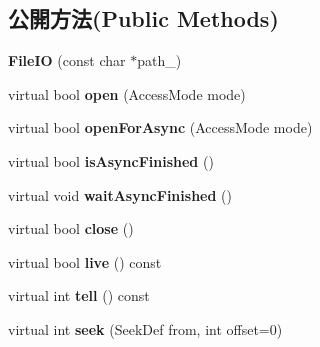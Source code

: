 \subsection*{公開方法(Public Methods)}
\begin{DoxyCompactItemize}
\item 
{\bfseries File\+IO} (const char $\ast$path\+\_\+)\hypertarget{class_i_dream_sky_1_1_file_i_o_a622f1f3857a55efd3cbae3e5ce7fbffb}{}\label{class_i_dream_sky_1_1_file_i_o_a622f1f3857a55efd3cbae3e5ce7fbffb}

\item 
virtual bool {\bfseries open} (Access\+Mode mode)\hypertarget{class_i_dream_sky_1_1_file_i_o_a3bf33683555f954f5854f97cd8536c24}{}\label{class_i_dream_sky_1_1_file_i_o_a3bf33683555f954f5854f97cd8536c24}

\item 
virtual bool {\bfseries open\+For\+Async} (Access\+Mode mode)\hypertarget{class_i_dream_sky_1_1_file_i_o_a97cd005ad13e08d09b33ad8e440ec09d}{}\label{class_i_dream_sky_1_1_file_i_o_a97cd005ad13e08d09b33ad8e440ec09d}

\item 
virtual bool {\bfseries is\+Async\+Finished} ()\hypertarget{class_i_dream_sky_1_1_file_i_o_a57231b695b6fedfc5010d3635e257710}{}\label{class_i_dream_sky_1_1_file_i_o_a57231b695b6fedfc5010d3635e257710}

\item 
virtual void {\bfseries wait\+Async\+Finished} ()\hypertarget{class_i_dream_sky_1_1_file_i_o_a5632bc0f6c84128f814d0005ec27f147}{}\label{class_i_dream_sky_1_1_file_i_o_a5632bc0f6c84128f814d0005ec27f147}

\item 
virtual bool {\bfseries close} ()\hypertarget{class_i_dream_sky_1_1_file_i_o_a2f90dd4eb613bfa22bcd9884ec1166d4}{}\label{class_i_dream_sky_1_1_file_i_o_a2f90dd4eb613bfa22bcd9884ec1166d4}

\item 
virtual bool {\bfseries live} () const \hypertarget{class_i_dream_sky_1_1_file_i_o_a8cbcf25aec5cfb8d1e98559885ee15bf}{}\label{class_i_dream_sky_1_1_file_i_o_a8cbcf25aec5cfb8d1e98559885ee15bf}

\item 
virtual int {\bfseries tell} () const \hypertarget{class_i_dream_sky_1_1_file_i_o_a8444874695c2716e3c8b0b2d3f702f0b}{}\label{class_i_dream_sky_1_1_file_i_o_a8444874695c2716e3c8b0b2d3f702f0b}

\item 
virtual int {\bfseries seek} (Seek\+Def from, int offset=0)\hypertarget{class_i_dream_sky_1_1_file_i_o_a7da6bb3e8f91a70f7b9e282f532db05b}{}\label{class_i_dream_sky_1_1_file_i_o_a7da6bb3e8f91a70f7b9e282f532db05b}


\end{DoxyCompactItemize}
